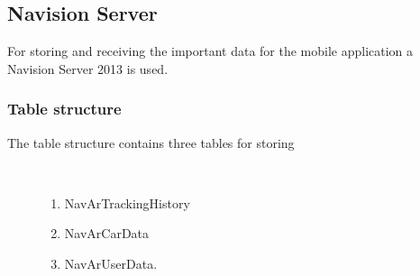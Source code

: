 \subsection{Navision Server}
For storing and receiving the important data for the mobile application a Navision Server 2013 is used.
\subsubsection{Table structure}
\begin{description}
   \item[The table structure contains three tables for storing]~\par
   \begin{enumerate}
      \item NavArTrackingHistory 
      \item NavArCarData
      \item	NavArUserData. 
   \end{enumerate}
\end{description}

